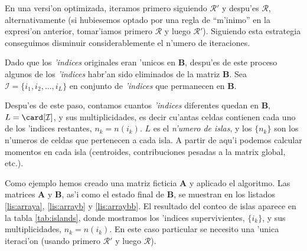 \begin{enumerate}
  En una versi'on optimizada, iteramos primero siguiendo
  $\mathcal{R}'$ y despu'es $\mathcal{R}$, alternativamente (si
  hubiesemos optado por una regla de ``m'inimo'' en la expresi'on
  anterior, tomar'iamos primero $\mathcal{R}$ y luego $\mathcal{R}'$).
  Siguiendo esta estrategia conseguimos disminuir considerablemente el
  n'umero de iteraciones.
  
  Dado que los \emph{'indices} originales eran 'unicos en
  $\mathbf{B}$, despu'es de este proceso algunos de los
  \emph{'indices} habr'an sido eliminados de la matriz $\mathbf{B}$.
  Sea $\mathcal{I}=\{i_1, i_2, \ldots, i_L\}$ en conjunto de
  \emph{'indices} que permanecen en $\mathbf{B}$.
  
\end{enumerate}

Despu'es de este paso, contamos cuantos \emph{'indices} diferentes
quedan en $\mathbf{B}$, $L = \card[\mathcal{I}]$, y sus
multiplicidades, es decir cu'antas celdas contienen cada uno de los
'indices restantes, $n_k = n(i_k)$.  $L$ es el \emph{n'umero de
  islas}, y los $\{n_k\}$ son los n'umeros de celdas que pertenecen a
cada isla.  A partir de aqu'i podemos calcular momentos en cada isla
(centroides, contribuciones pesadas a la matrix global, etc.).

Como ejemplo hemos creado una matriz ficticia $\mathbf{A}$ y aplicado
el algoritmo.  Las matrices $\mathbf{A}$ y $\mathbf{B}$, as'i como el
estado final de $\mathbf{B}$, se muestran en los listados
\ref{lis:arraya}, \ref{lis:arrayb} y \ref{lis:arraybb}.  El resultado
del conteo de islas aparece en la tabla \ref{tab:islands}, donde
mostramos los 'indices supervivientes, $\{i_k\}$, y sus
multiplicidades, $n_k = n(i_k)$.  En este caso particular se necesito
una 'unica iteraci'on (usando primero $\mathcal{R}'$ y luego
$\mathcal{R}$).


